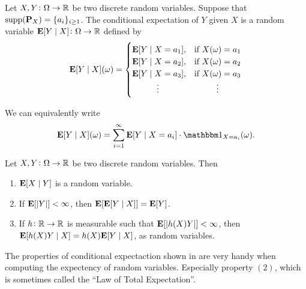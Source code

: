 \documentclass[11pt,a4paper]{article}
\begin{document}
\begin{definition}
  Let $X,Y \colon \Omega \to \mathbb{R}$ be two discrete random variables.
  Suppose that $\operatorname{supp}(\mathbf{P}_X) = \{a_i\}_{i \geq 1}$.
  The conditional expectation of $Y$ given $X$ is a random variable
  $\mathbf{E}[Y \mid X] \colon \Omega \to \mathbb{R}$ defined by
  \[
    \E[Y \mid X](\omega) =
    \begin{cases}
      \E[Y \mid X = a_1], &\text{if } X(\omega) = a_1 \\
      \E[Y \mid X = a_2], &\text{if } X(\omega) = a_2 \\
      \E[Y \mid X = a_3], &\text{if } X(\omega) = a_3 \\
      \vdotswithin{\E[Y \mid X = a_3]}
                          &\vdotswithin{\text{if } X(\omega) = a_3}
    \end{cases}
  \]
\end{definition}
\begin{remark}
  We can equivalently write
  \[
    \E[Y \mid X](\omega) =
    \sum_{i=1}^{\infty} \E[Y \mid X = a_i] \cdot \ind_{X = a_i}(\omega).
  \]
\end{remark}

\begin{proposition}
  \label{prop:conditional-expectacion-properties}
  Let $X,Y \colon \Omega \to \mathbb{R}$ be two discrete random variables.
  Then
  \begin{enumerate}
    \item[(1)] $\mathbf{E}[X \mid Y]$ is a random variable.
    \item[(2)] If $\mathbf{E}[|Y|] < \infty$, then $\mathbf{E}[\mathbf{E}[Y \mid X]] = \mathbf{E}[Y]$.
    \item[(3)] If $h \colon \mathbb{R} \to \mathbb{R}$ is measurable such that
      $\mathbf{E}[|h(X)Y|] < \infty$, then $\mathbf{E}[h(X)Y \mid X] = h(X) \mathbf{E}[Y \mid X]$,
      as random variables.
  \end{enumerate}
\end{proposition}

\begin{remark}
  The properties of conditional expectaction
  shown in 
  are very handy when computing the expectency of random variables.
  Especially property $(2)$,
  which is sometimes called the ``Law of Total Expectation''.
\end{remark}
\end{document}
